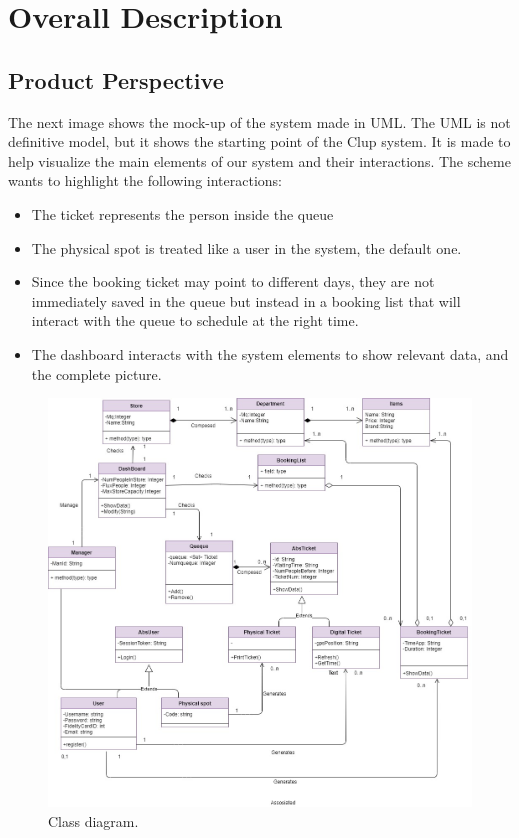 \chapter{Overall Description}

\section{Product Perspective}
The next image shows the mock-up of the system made in UML. The UML is not definitive model, but it shows the starting point of the Clup system. It is made to help visualize the main elements of our system and their interactions. The scheme wants to highlight the following interactions:
\begin{itemize}

	\item The ticket represents the person inside the queue

	\item The physical spot is treated like a user in the system, the default one. 

	\item Since the booking ticket may point to different days, they are not immediately saved in the queue but instead in a booking list that will interact with the 	queue to schedule at the right time.

	\item The dashboard interacts with the system elements to show relevant data, and the complete picture. 
\end{itemize}

\begin{figure}[H]
	\centering
	\includegraphics[width=1.0\textwidth]{images/uml.jpg}
	\caption{Class diagram.}
\end{figure}

